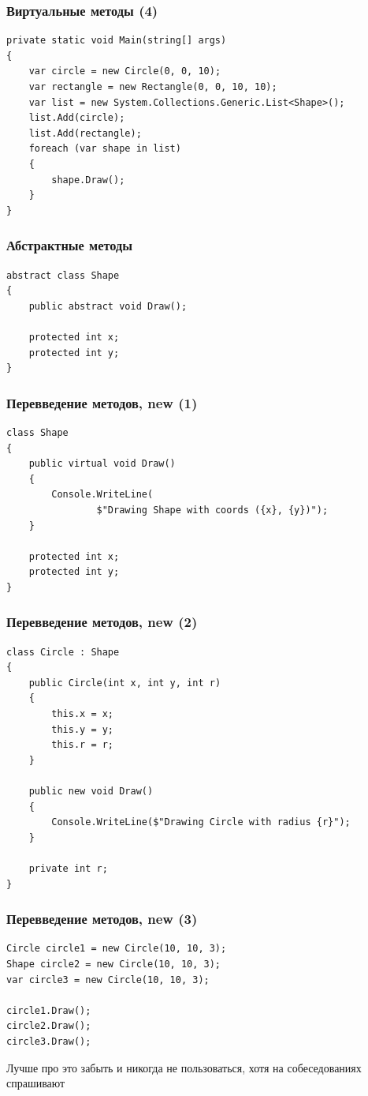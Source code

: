 \documentclass{../../slides-style}
\begin{document}
    \begin{frame}[fragile]
        \frametitle{Виртуальные методы (4)}
        \begin{verbatim}
private static void Main(string[] args)
{
    var circle = new Circle(0, 0, 10);
    var rectangle = new Rectangle(0, 0, 10, 10);
    var list = new System.Collections.Generic.List<Shape>();
    list.Add(circle);
    list.Add(rectangle);
    foreach (var shape in list)
    {
        shape.Draw();
    }
}
        \end{verbatim}
    \end{frame}

    \begin{frame}[fragile]
        \frametitle{Абстрактные методы}
        \begin{verbatim}
abstract class Shape
{
    public abstract void Draw();

    protected int x;
    protected int y;
}
        \end{verbatim}
\end{frame}

    \begin{frame}[fragile]
        \frametitle{Перевведение методов, new (1)}
        \begin{verbatim}
class Shape
{
    public virtual void Draw()
    {
        Console.WriteLine(
                $"Drawing Shape with coords ({x}, {y})");
    }

    protected int x;
    protected int y;
}
        \end{verbatim}
    \end{frame}

    \begin{frame}[fragile]
        \frametitle{Перевведение методов, new (2)}
        \begin{small}
            \begin{verbatim}
class Circle : Shape
{
    public Circle(int x, int y, int r)
    {
        this.x = x;
        this.y = y;
        this.r = r;
    }

    public new void Draw()
    {
        Console.WriteLine($"Drawing Circle with radius {r}");
    }

    private int r;
}
            \end{verbatim}
        \end{small}
    \end{frame}

    \begin{frame}[fragile]
        \frametitle{Перевведение методов, new (3)}
        \begin{verbatim}
Circle circle1 = new Circle(10, 10, 3);
Shape circle2 = new Circle(10, 10, 3);
var circle3 = new Circle(10, 10, 3);

circle1.Draw();
circle2.Draw();
circle3.Draw();
        \end{verbatim}
        \vspace{1cm}
        Лучше про это забыть и никогда не пользоваться, хотя на собеседованиях спрашивают
    \end{frame}
\end{document}
